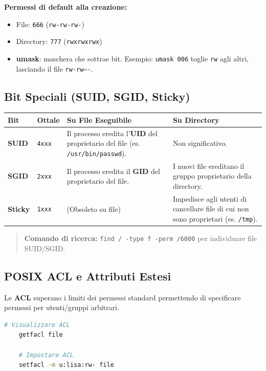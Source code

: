 \documentclass[12pt, a4paper]{report}
\begin{document}
\textbf{Permessi di default alla creazione:}
\begin{itemize}
	\item File: \texttt{666} (\texttt{rw-rw-rw-})
	\item Directory: \texttt{777} (\texttt{rwxrwxrwx})
	\item \textbf{umask}: maschera che sottrae bit. Esempio: \texttt{umask 006} toglie \texttt{rw} agli altri, lasciando il file \texttt{rw-rw----}.
\end{itemize}

\subsection{Bit Speciali (SUID, SGID, Sticky)}

\begin{table}[H]
	\centering
	\begin{tabular}{|l|l|p{5cm}|p{5cm}|}
		\hline
		\textbf{Bit} & \textbf{Ottale} & \textbf{Su File Eseguibile} & \textbf{Su Directory} \\ \hline
		\textbf{SUID} & \texttt{4xxx} & Il processo eredita l'\textbf{UID} del proprietario del file (es. \texttt{/usr/bin/passwd}). & Non significativo. \\ \hline
		\textbf{SGID} & \texttt{2xxx} & Il processo eredita il \textbf{GID} del proprietario del file. & I nuovi file ereditano il gruppo proprietario della directory. \\ \hline
		\textbf{Sticky} & \texttt{1xxx} & (Obsoleto su file) & Impedisce agli utenti di cancellare file di cui non sono proprietari (es. \texttt{/tmp}). \\ \hline
	\end{tabular}
\end{table}

\begin{quote}
	\textbf{Comando di ricerca:} \texttt{find / -type f -perm /6000} per individuare file SUID/SGID.
\end{quote}

\subsection{POSIX ACL e Attributi Estesi}
Le \textbf{ACL} superano i limiti dei permessi standard permettendo di specificare permessi per utenti/gruppi arbitrari.

\begin{lstlisting}[language=bash]
	# Visualizzare ACL
	getfacl file
	
	# Impostare ACL
	setfacl -m u:lisa:rw- file
\end{lstlisting}
\end{document}
